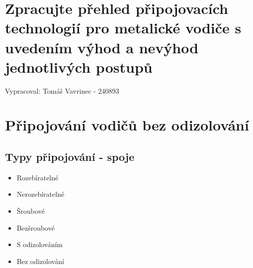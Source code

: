 \documentclass{article}
\begin{document}
\section*{Zpracujte přehled připojovacích technologií pro metalické vodiče s uvedením výhod a nevýhod jednotlivých postupů}

Vypracoval: Tomáš Vavrinec - 240893

\section{Připojování vodičů bez odizolování}

\subsection{Typy připojování - spoje}
\begin{itemize}
  \item Rozebíratelné
  \item Nerozebíratelné
\end{itemize}

\begin{itemize}
  \item Šroubové
  \item Bezšroubové
\end{itemize}

\begin{itemize}
  \item S odizolováním
  \item Bez odizolování
\end{itemize}
\end{document}
